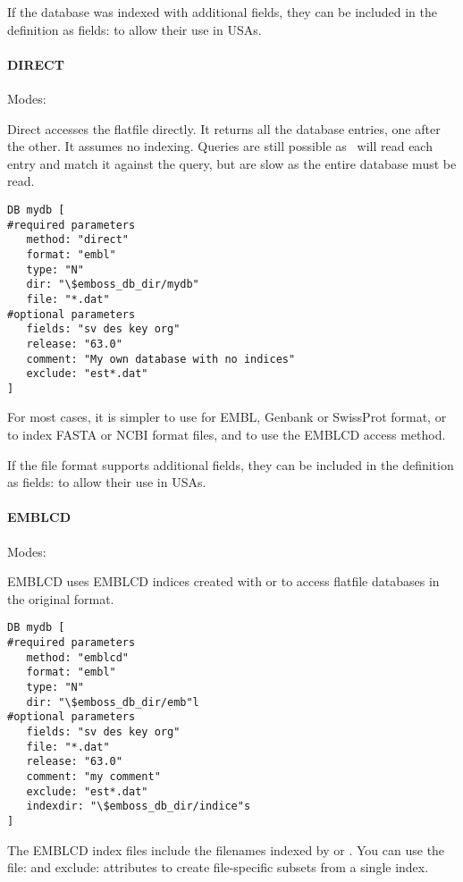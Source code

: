 \documentclass{report}
\begin{document}
If the database was indexed with additional fields, they can be
included in the definition as fields: to allow their use in USAs.

\paragraph{DIRECT}\par\noindent
Modes: \par\noindent Direct accesses the flatfile
directly. It returns all the database entries, one after the other. It
assumes no indexing. Queries are still possible as \EMBOSS\ will read
each entry and match it against the query, but are slow as the entire
database must be read.
 
\begin{verbatim}
DB mydb [ 
#required parameters
   method: "direct"
   format: "embl"
   type: "N"
   dir: "\$emboss_db_dir/mydb"
   file: "*.dat"   
#optional parameters
   fields: "sv des key org"
   release: "63.0"
   comment: "My own database with no indices"
   exclude: "est*.dat"
]
\end{verbatim}

For most cases, it is simpler to use  for EMBL,
Genbank or SwissProt format, or  to index FASTA or NCBI
format files, and to use the EMBLCD access method.

If the file format supports additional fields, they can be
included in the definition as fields: to allow their use in USAs.

\paragraph{EMBLCD}\par\noindent
Modes: \par\noindent EMBLCD uses EMBLCD indices created
with  or  to access flatfile
databases in the original format.

\begin{verbatim}
DB mydb [
#required parameters
   method: "emblcd"
   format: "embl"
   type: "N"
   dir: "\$emboss_db_dir/emb"l
#optional parameters
   fields: "sv des key org"
   file: "*.dat"
   release: "63.0"
   comment: "my comment"
   exclude: "est*.dat"
   indexdir: "\$emboss_db_dir/indice"s
]
\end{verbatim}

The EMBLCD index files include the filenames indexed by
 or . You can use the file: and
exclude: attributes to create file-specific subsets from a single
index.
\end{document}
